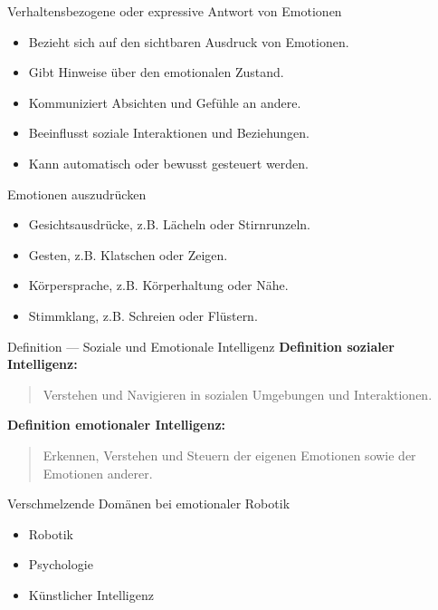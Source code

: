 \documentclass[aspectratio=169]{beamer}
\begin{document}
\begin{frame}{Verhaltensbezogene oder expressive Antwort von Emotionen}
  \begin{itemize}
      \item Bezieht sich auf den sichtbaren Ausdruck von Emotionen.
      \item Gibt Hinweise über den emotionalen Zustand.
      \item Kommuniziert Absichten und Gefühle an andere.
      \item Beeinflusst soziale Interaktionen und Beziehungen.
      \item Kann automatisch oder bewusst gesteuert werden.
  \end{itemize}
\end{frame}

\begin{frame}{Emotionen auszudrücken}
  \begin{itemize}
      \item Gesichtsausdrücke, z.B. Lächeln oder Stirnrunzeln.
      \item Gesten, z.B. Klatschen oder Zeigen.
      \item Körpersprache, z.B. Körperhaltung oder Nähe.
      \item Stimmklang, z.B. Schreien oder Flüstern.
  \end{itemize}
\end{frame}

\begin{frame}{Definition --- Soziale und Emotionale Intelligenz}
  \textbf{Definition sozialer Intelligenz:}
  \begin{quote}
      Verstehen und Navigieren in sozialen Umgebungen und Interaktionen.
  \end{quote}
  
  \textbf{Definition emotionaler Intelligenz:}
  \begin{quote}
      Erkennen, Verstehen und Steuern der eigenen Emotionen sowie der Emotionen anderer.
  \end{quote}
\end{frame}

\begin{frame}{Verschmelzende Domänen bei emotionaler Robotik}
  \begin{itemize}
      \item Robotik
      \item Psychologie
      \item Künstlicher Intelligenz
  \end{itemize}
\end{frame}
\end{document}
